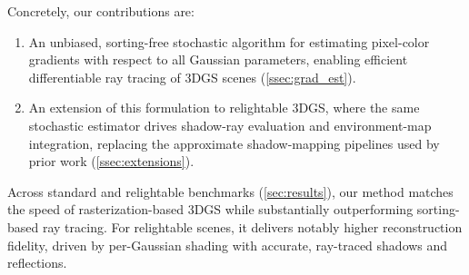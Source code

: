 Concretely, our contributions are:
%
\begin{enumerate}
	\item An unbiased, sorting-free stochastic algorithm for estimating pixel-color gradients with respect to all Gaussian parameters, enabling efficient differentiable ray tracing of 3DGS scenes (\autoref{ssec:grad_est}).
	\item An extension of this formulation to relightable 3DGS, where the same stochastic estimator drives shadow-ray evaluation and environment-map integration, replacing the approximate shadow-mapping pipelines used by prior work (\autoref{ssec:extensions}).
\end{enumerate}

Across standard and relightable benchmarks (\autoref{sec:results}), our method matches the speed of rasterization-based 3DGS while substantially outperforming sorting-based ray tracing.
For relightable scenes, it delivers notably higher reconstruction fidelity, driven by per-Gaussian shading with accurate, ray-traced shadows and reflections.
